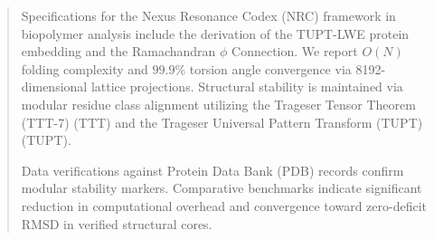 \vspace{0.2cm}
\begin{abstract}
	Specifications for the Nexus Resonance Codex (NRC) framework in biopolymer analysis include the derivation of the TUPT-LWE protein embedding and the Ramachandran $\phi$ Connection. We report $O(N)$ folding complexity and $99.9\%$ torsion angle convergence via 8192-dimensional lattice projections. Structural stability is maintained via modular residue class alignment utilizing the Trageser Tensor Theorem (TTT-7) (TTT) and the Trageser Universal Pattern Transform (TUPT) (TUPT).

	Data verifications against Protein Data Bank (PDB) records confirm modular stability markers. Comparative benchmarks indicate significant reduction in computational overhead and convergence toward zero-deficit RMSD in verified structural cores.
\end{abstract}
